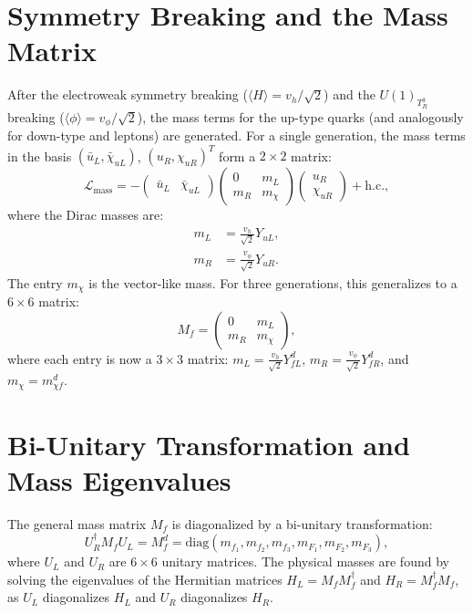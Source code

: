 \section{Symmetry Breaking and the Mass Matrix}
After the electroweak symmetry breaking ($\langle H \rangle = v_h / \sqrt{2}$) and the $U(1)_{T_R^3}$ breaking ($\langle \phi \rangle = v_\phi / \sqrt{2}$), the mass terms for the up-type quarks (and analogously for down-type and leptons) are generated. For a single generation, the mass terms in the basis $(\bar{u}_L, \bar{\chi}_{u L})$, $(u_R, \chi_{u R})^T$ form a $2 \times 2$ matrix:
\begin{equation}
\mathcal{L}_{\text{mass}} = - \begin{pmatrix} \bar{u}_L & \bar{\chi}_{u L} \end{pmatrix}
\begin{pmatrix}
0 & m_L \\
m_R & m_{\chi}
\end{pmatrix}
\begin{pmatrix} u_R \\ \chi_{u R} \end{pmatrix} + \text{h.c.}, \label{eq:mass_matrix_detail}
\end{equation}
where the Dirac masses are:
\begin{align*}
m_L &= \frac{v_h}{\sqrt{2}} Y_{uL}, \\
m_R &= \frac{v_\phi}{\sqrt{2}} Y_{uR}.
\end{align*}
The entry $m_{\chi}$ is the vector-like mass. For three generations, this generalizes to a $6 \times 6$ matrix:
\begin{equation}
M_f = \begin{pmatrix}
0 & m_L \\
m_R & m_{\chi}
\end{pmatrix},
\end{equation}
where each entry is now a $3 \times 3$ matrix: $m_L = \frac{v_h}{\sqrt{2}} Y_{fL}^{d}$, $m_R = \frac{v_\phi}{\sqrt{2}} Y_{fR}^{d}$, and $m_{\chi} = m_{\chi f}^{d}$.

\section{Bi-Unitary Transformation and Mass Eigenvalues}
The general mass matrix $M_f$ is diagonalized by a bi-unitary transformation:
\begin{equation}
U_{R}^{\dagger} M_f U_{L} = M_f^d = \text{diag}(m_{f_1}, m_{f_2}, m_{f_3}, m_{F_1}, m_{F_2}, m_{F_3}), \label{eq:bi_unitary_detail}
\end{equation}
where $U_{L}$ and $U_{R}$ are $6 \times 6$ unitary matrices. The physical masses are found by solving the eigenvalues of the Hermitian matrices $H_L = M_f M_f^\dagger$ and $H_R = M_f^\dagger M_f$, as $U_L$ diagonalizes $H_L$ and $U_R$ diagonalizes $H_R$.

